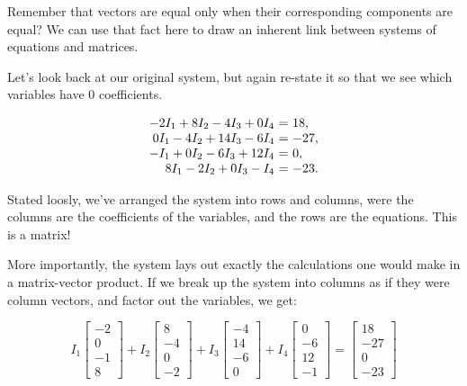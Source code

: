 \documentclass{ximera}
\begin{document}
\begin{example}
\begin{remark}

  Remember that vectors are equal only when their corresponding components are equal? We can use that fact here to draw an inherent link between systems of equations and matrices.

  Let's look back at our original system, but again re-state it so that we see which variables have $0$ coefficients.

  \begin{equation*}
    \begin{array}{r@{~}c@{~}l}
      -2I_1+8I_2-4I_3+0I_4&=&18, \\
      0I_1- 4I_2 + 14I_3 - 6I_4 &=& -27, \\
      -I_1 +0I_2- 6I_3 + 12I_4 &=& 0, \\
      8I_1-2I_2 +0I_3- I_4 &=& -23.
    \end{array}
  \end{equation*}

  Stated loosly, we've arranged the system into rows and columns, were the columns are the coefficients of the variables, and the rows are the equations. This is a matrix!

  More importantly, the system lays out exactly the calculations one would make in a matrix-vector product. If we break up the system into columns as if they were column vectors, and factor out the variables, we get:

$$I_1\begin{bmatrix}-2 \\ 0\\-1\\8\end{bmatrix}
+I_2\begin{bmatrix}8 \\ -4\\0\\-2\end{bmatrix}
+I_3\begin{bmatrix}-4 \\ 14\\-6\\0\end{bmatrix}
+I_4\begin{bmatrix}0 \\ -6\\12\\-1\end{bmatrix}
=
\begin{bmatrix}18 \\ -27\\0\\-23\end{bmatrix}$$


\end{remark}
\end{example}
\end{document}
